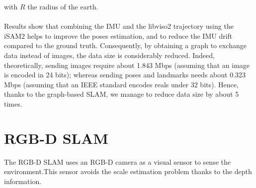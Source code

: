with $R$ the radius of the earth.\\\\
Results show that combining the IMU and the libviso2 trajectory using the iSAM2 helps to improve the poses estimation, and to reduce the IMU drift compared to the ground truth. Consequently, by obtaining a graph to exchange data instead of images, the data size is considerably reduced. Indeed, theoretically, sending images require about 1.843 Mbps (assuming that an image is encoded in 24 bits); whereas sending poses and landmarks needs about 0.323 Mbps (assuming that an IEEE standard encodes reals under 32 bits). Hence, thanks to the graph-based SLAM, we manage to reduce data size by about 5 times.
\section{RGB-D SLAM}
The RGB-D SLAM uses an RGB-D camera as a visual sensor to sense the environment.This sensor avoids the scale estimation problem thanks to the depth information.

